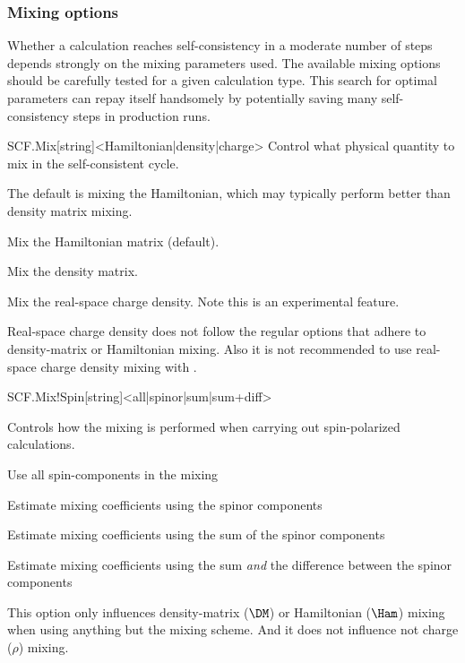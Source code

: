 \subsubsection{Mixing options}

Whether a calculation reaches self-consistency in a moderate number of
steps depends strongly on the mixing parameters used. The available
mixing options should be carefully tested for a given calculation
type. This search for optimal parameters can repay itself handsomely
by potentially saving many self-consistency steps in production runs.


\begin{fdfentry}{SCF.Mix}[string]<Hamiltonian|density|charge>
  Control what physical quantity to mix in the self-consistent cycle.

  The default is mixing the Hamiltonian, which may typically perform
  better than density matrix mixing. 

  \begin{fdfoptions}
    \option[Hamiltonian]%
    Mix the Hamiltonian matrix (default).

    \option[density]%
    Mix the density matrix.

    \option[charge]%
    Mix the real-space charge density. Note this is an experimental
    feature.

  \end{fdfoptions}
  
  \note Real-space charge density does not follow the regular options
  that adhere to density-matrix or Hamiltonian mixing. Also it is not
  recommended to use real-space charge density mixing with \tsiesta.

\end{fdfentry}

\begin{fdfentry}{SCF.Mix!Spin}[string]<all|spinor|sum|sum+diff>

  Controls how the mixing is performed when carrying out
  spin-polarized calculations.
  
  \begin{fdfoptions}
    \option[all] %
    Use all spin-components in the mixing

    \option[spinor] %
    Estimate mixing coefficients using the spinor components

    \option[sum] %
    Estimate mixing coefficients using the sum of the spinor
    components 

    Estimate mixing coefficients using the sum \emph{and} the
    difference between the spinor components 
  \end{fdfoptions}

  \note This option only influences density-matrix ($\DM$) or
  Hamiltonian ($\Ham$) mixing when using anything but the
   mixing scheme. And it does not influence not charge
  ($\rho$) mixing.
  
\end{fdfentry}

